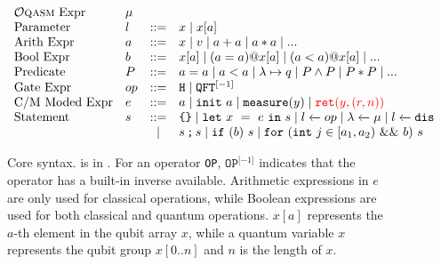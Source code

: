 \begin{figure}[t]
{
  \small
  \[\begin{array}{llcl} 
      \text{\oqasm Expr} & \mu\\
      \text{Parameter} & l & ::= & x \mid x[a] \\
      \text{Arith Expr} & a & ::= & x \mid v \mid a + a \mid a * a \mid ... \\
      \text{Bool Expr} & b & ::= & x[a] \mid (a = a) @ x[a] \mid (a < a) @ x[a] \mid ... \\
      \text{Predicate} & P & ::= & a = a \mid a < a \mid \lambda \mapsto q \mid P \wedge P \mid P * P \mid ... \\
      \text{Gate Expr} & op & ::= & \texttt{H} \mid \iqft[\lbrack -1 \rbrack]{}{} \\
      \text{C/M Moded Expr}& e & ::= & a \mid \sinit{a} \mid \smea{y} \mid \textcolor{red}{\sret{y,(r,n)}} \\
      \text{Statement} & s & ::= & \sskip \mid \sexp{x}{e}{s} \mid  \ssassign{l}{}{op} \mid \ssassign{\lambda}{}{\mu} 
                                 \mid \ssassign{l}{}{\sdis}
                                 \\ & & \mid & \sseq{s}{s} \mid \sifq{b}{s} \mid
                                     \sqwhile{j}{a_1}{a_2}{b}{s}
    \end{array}
  \]
}
  \caption{Core \qafny syntax. \oqasm is in . For an operator \texttt{OP}, $\texttt{OP}^{\lbrack -1 \rbrack}$ indicates that the operator has a built-in inverse available. Arithmetic expressions in $e$ are only used for classical operations, while Boolean expressions are used for both classical and quantum operations. $x[a]$ represents the $a$-th element in the qubit array $x$, while a quantum variable $x$ represents the qubit group $x[0..n]$ and $n$ is the length of $x$. }
  \label{fig:vqimp}
\end{figure}

